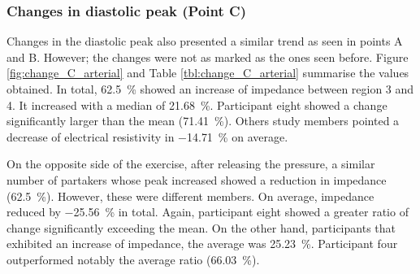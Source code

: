 \subsubsection{Changes in diastolic peak (Point C)}
\label{section results 3.2.3}
Changes in the diastolic peak also presented a similar trend as seen in points A and B. However; the changes were not as marked as the ones seen before. Figure \ref{fig:change_C_arterial} and Table \ref{tbl:change_C_arterial} summarise the values obtained. In total, \SI{62.5}{\percent} showed an increase of impedance between region 3 and 4. It increased with a median of \SI{21.68}{\percent}. Participant eight showed a change significantly larger than the mean (\SI{71.41}{\percent}). Others study members pointed a decrease of electrical resistivity in \SI{-14.71}{\percent} on average.  

On the opposite side of the exercise, after releasing the pressure, a similar number of partakers whose peak increased showed a reduction in impedance (\SI{62.5}{\percent}).  However, these were different members. On average, impedance reduced by \SI{-25.56}{\percent} in total. Again, participant eight showed a greater ratio of change significantly exceeding the mean. On the other hand, participants that exhibited an increase of impedance, the average was \SI{25.23}{\percent}. Participant four outperformed notably the average ratio (\SI{66.03}{\percent}).

